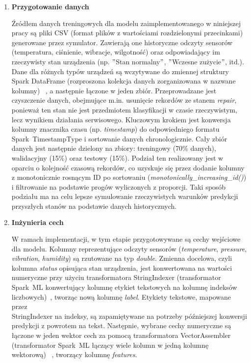 \vspace{0.3em}

\begin{enumerate}
    \setlength\itemsep{0.5em}

    \item \textbf{Przygotowanie danych}

Źródłem danych treningowych dla modelu zaimplementowanego w niniejszej pracy są pliki CSV (format plików z wartościami rozdzielonymi przecinkami)~\cite{csv_rfc} generowane przez symulator. Zawierają one historyczne odczyty sensorów (temperatura, ciśnienie, wibracje, wilgotność) oraz odpowiadający im rzeczywisty stan urządzenia (np. \("\)Stan normalny\("\), \("\)Wczesne zużycie\("\), itd.). Dane dla różnych typów urządzeń są wczytywane do zmiennej struktury Spark DataFrame (rozproszona kolekcja danych zorganizowana w nazwane kolumny)~\cite{chambers2018spark} , a następnie łączone w jeden zbiór. Przeprowadzane jest czyszczenie danych, obejmujące m.in. usunięcie rekordów ze stanem \textit{repair}, ponieważ ten stan nie jest przedmiotem klasyfikacji w czasie rzeczywistym, lecz wynikiem działania serwisowego. Kluczowym krokiem jest konwersja kolumny znacznika czasu (np. \textit{timestamp}) do odpowiedniego formatu \mbox{Spark TimestampType} i sortowanie danych chronologicznie. Cały zbiór danych jest następnie dzielony na zbiory: treningowy (70\% danych), walidacyjny (15\%) oraz testowy (15\%). Podział ten realizowany jest w oparciu o kolejność czasową rekordów, co uzyskuje się przez dodanie kolumny z monotonicznie rosnącym ID po sortowaniu (\textit{monotonically\_increasing\_id()}) i filtrowanie na podstawie progów wyliczonych z proporcji. Taki sposób podziału ma na celu lepsze symulowanie rzeczywistych warunków predykcji przyszłych stanów na podstawie danych historycznych.

 \item \textbf{Inżynieria cech}

W ramach implementacji, w tym etapie przygotowywane są cechy wejściowe dla modelu. Kolumny reprezentujące odczyty sensorów (\textit{temperature}, \textit{pressure}, \textit{vibration}, \textit{humidity}) są rzutowane na typ \textit{double}. Zmienna docelowa, czyli kolumna \textit{status} opisująca stan urządzenia, jest konwertowana na wartości numeryczne przy użyciu transformatora StringIndexer (transformator \mbox{Spark ML} konwertujący kolumnę etykiet tekstowych na kolumnę indeksów liczbowych)~\cite{spark_mllib_reference}, tworząc nową kolumnę \textit{label}. Etykiety tekstowe, mapowane przez \\ StringIndexer na indeksy, są zapamiętywane na potrzeby późniejszej konwersji predykcji z powrotem na tekst. Następnie, wybrane cechy numeryczne są łączone w jeden wektor cech za pomocą transformatora VectorAssembler (transformator \mbox{Spark ML} łączący wiele kolumn w jedną kolumnę wektorową)~\cite{spark_mllib_reference} , tworzący kolumnę \textit{features}.


\end{enumerate}
